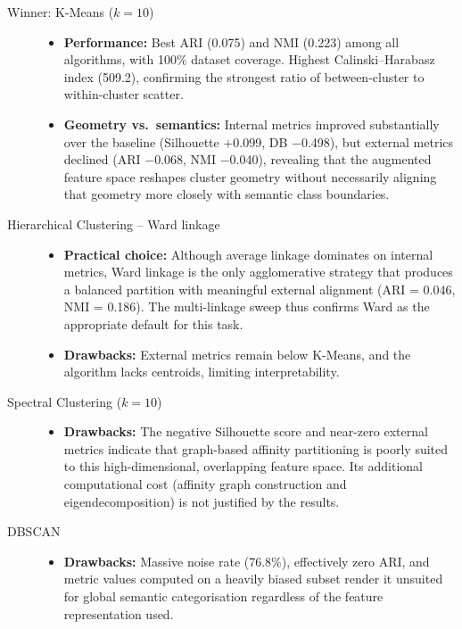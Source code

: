 \documentclass[runningheads,a4paper,11pt]{report}
\begin{document}
\begin{description}
    \item[Winner: K-Means ($k=10$)] \hfill
    \begin{itemize}
        \item \textbf{Performance:} Best ARI (0.075) and NMI (0.223) among all algorithms, with 100\% dataset coverage. Highest Calinski--Harabasz index (509.2), confirming the strongest ratio of between-cluster to within-cluster scatter.
        \item \textbf{Geometry vs.\ semantics:} Internal metrics improved substantially over the baseline (Silhouette $+$0.099, DB $-$0.498), but external metrics declined (ARI $-$0.068, NMI $-$0.040), revealing that the augmented feature space reshapes cluster geometry without necessarily aligning that geometry more closely with semantic class boundaries.
    \end{itemize}

    \item[Hierarchical Clustering -- Ward linkage] \hfill
    \begin{itemize}
        \item \textbf{Practical choice:} Although average linkage dominates on internal metrics, Ward linkage is the only agglomerative strategy that produces a balanced partition with meaningful external alignment (ARI = 0.046, NMI = 0.186). The multi-linkage sweep thus confirms Ward as the appropriate default for this task.
        \item \textbf{Drawbacks:} External metrics remain below K-Means, and the algorithm lacks centroids, limiting interpretability.
    \end{itemize}

    \item[Spectral Clustering ($k=10$)] \hfill
    \begin{itemize}
        \item \textbf{Drawbacks:} The negative Silhouette score and near-zero external metrics indicate that graph-based affinity partitioning is poorly suited to this high-dimensional, overlapping feature space. Its additional computational cost (affinity graph construction and eigendecomposition) is not justified by the results.
    \end{itemize}

    \item[DBSCAN] \hfill
    \begin{itemize}
        \item \textbf{Drawbacks:} Massive noise rate (76.8\%), effectively zero ARI, and metric values computed on a heavily biased subset render it unsuited for global semantic categorisation regardless of the feature representation used.
    \end{itemize}
\end{description}
\end{document}
